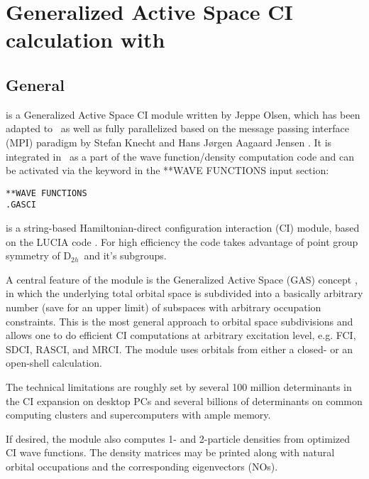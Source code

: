\chapter{Generalized Active Space CI calculation with {\lucita}}\label{ch:lucita}

\section{General}\label{sec:lucita-general}

{\lucita} is a Generalized Active Space CI module written by Jeppe Olsen, 
which has been adapted to \dalton\ as well as fully parallelized 
based on the message passing interface (MPI) paradigm 
by Stefan Knecht and Hans J{\o}rgen Aagaard Jensen \cite{knecht08}.
It is integrated in \dalton\ as a part of the wave function/density computation code 
and can be activated via the keyword {} in the **WAVE FUNCTIONS 
input section:\\[2ex]
\begin{inputex} \begin{verbatim}
**WAVE FUNCTIONS
.GASCI
\end{verbatim} \end{inputex}
\vspace{2ex}

{\lucita} is a string-based Hamiltonian-direct configuration interaction (CI) module, based on the LUCIA code \cite{olsen90}. 
For high efficiency the code takes advantage of point group symmetry of D$_{2h}$\ and it's subgroups.

A central feature of the module is the Generalized Active Space (GAS) concept \cite{fleig_gasci2}, 
in which the underlying total orbital space is subdivided 
into a basically arbitrary number (save for an upper limit) 
of subspaces with arbitrary occupation constraints. 
This is the most general approach to orbital space subdivisions and allows one to do 
efficient CI computations at arbitrary excitation level, e.g. FCI, SDCI, RASCI, 
and MRCI. The module uses orbitals from either a closed- or an open-shell calculation.

The technical limitations are roughly set by several 100 million determinants 
in the CI expansion on desktop PCs and several billions of determinants 
on common computing clusters and supercomputers with ample memory.

If desired, the module also computes 1- and 2-particle densities from optimized CI wave functions. 
The density matrices may be printed along with natural orbital occupations 
and the corresponding eigenvectors (NOs).

